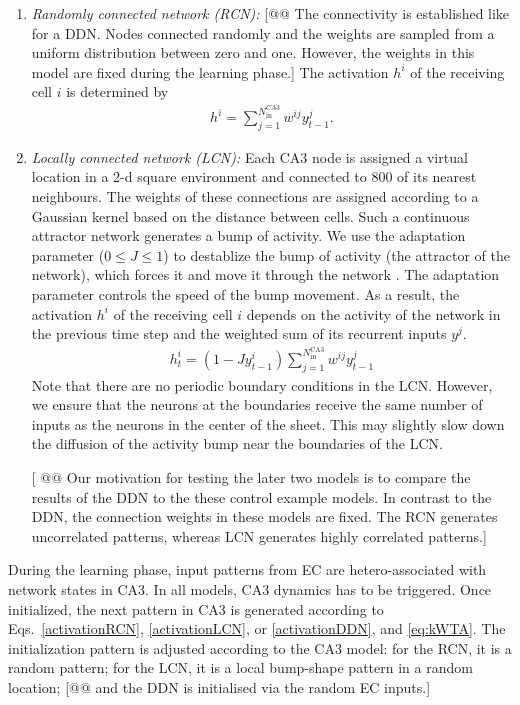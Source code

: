 \documentclass[utf8]{frontiersSCNS} %
\begin{document}
\begin{enumerate}
\item \textit{Randomly connected network (RCN):} 
[@@ The connectivity is established like for a DDN. 
Nodes connected randomly and the weights are sampled from a uniform distribution between zero and one. However, the weights in this model are fixed during the learning phase.]
%
The activation $h^i$ of the receiving cell $i$ is determined by
%
\begin{align}
	\label{activationRCN}
	h^i = \sum_{j=1}^{N^{CA3}_\mathrm{in}} w^{ij}y^{j}_{t-1}.
\end{align}  
%
\item \textit{Locally connected network (LCN):} Each CA3 node is assigned a virtual location in a 2-d square environment and connected to $800$ of its nearest neighbours. The weights of these connections are assigned according to a Gaussian kernel based on the distance between cells. 
Such a continuous attractor network generates a bump of activity. We use the adaptation parameter ($0 \leq J \leq 1$) to destablize the bump of activity (the attractor of the network), which forces it and move it through the network \citep{azizi2013computational}. The adaptation parameter controls the speed of the bump movement. 
As a result, the activation $h^i$ of the receiving cell $i$ depends on the activity of the network in the previous time step and the weighted sum of its recurrent inputs $y^j$.
%
\begin{align}
\label{activationLCN}
h^{i}_{t} = (1 - J y^{i}_{t-1}) \sum_{j = 1}^{N^\mathrm{CA3}_\mathrm{in}} {{w^{ij} y^{j}_{t-1}}}
\end{align}
%
Note that there are no periodic boundary conditions in the LCN. However, we ensure that the neurons at the boundaries receive the same number of inputs as the neurons in the center of the sheet. This may slightly slow down the diffusion of the activity bump near the boundaries of the LCN.

[ @@ Our motivation for testing the later two models is to compare the results of the DDN to the these control example models. In contrast to the DDN, the connection weights in these models are fixed. The RCN generates uncorrelated patterns, whereas LCN generates highly correlated patterns.]      

\end{enumerate}

During the learning phase, input patterns from EC are hetero-associated with network states in CA3. In all models, CA3 dynamics has to be triggered. Once initialized, the next pattern in CA3 is generated according to Eqs.~\ref{activationRCN}, \ref{activationLCN}, or \ref{activationDDN}, and \ref{eq:kWTA}.
The initialization pattern is adjusted according to the CA3 model: for the RCN, it is a random pattern; for the LCN, it is a local bump-shape pattern in a random location; [@@ and the DDN is initialised via the random EC inputs.]
%
   
\end{document}
